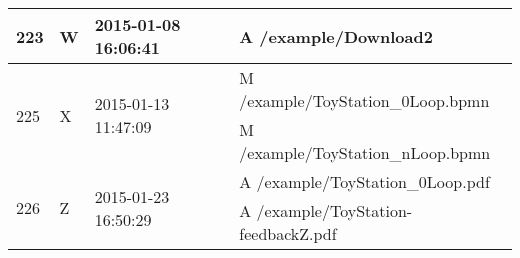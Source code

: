 \begin{table}
\begin{tabular}{m{.8cm} m{1.5cm} m{3cm} p{5.8cm}}
223 & W & 2015-01-08 16:06:41 & A /example/Download2\\ \hline %

\multirow{2}{*}{225} & \multirow{2}{*}{X} & \multirow{2}{*}{2015-01-13 11:47:09} & M /example/ToyStation\_0Loop.bpmn\\
& & & M /example/ToyStation\_nLoop.bpmn \\ \hline %

\multirow{2}{*}{226} & \multirow{2}{*}{Z} & \multirow{2}{*}{2015-01-23 16:50:29} & A /example/ToyStation\_0Loop.pdf\\
& & & A /example/ToyStation-feedbackZ.pdf\\ \hline %
\end{tabular}\\ \hfill

\end{table}
